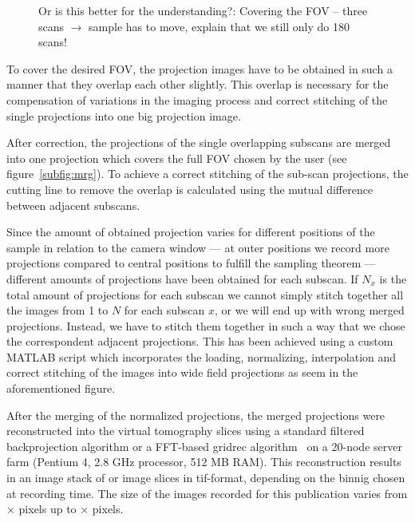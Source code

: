 \begin{figure*}[tb]
	\centering
	
	\caption{Or is this better for the understanding?: Covering the FOV -- three scans $\rightarrow$ sample has to move, explain that we still only do \unit{180}{\degree} scans!}
	\label{fig:covering-three scans b}
\end{figure*}

To cover the desired FOV, the projection images have to be obtained in such a manner that they overlap each other slightly. This overlap is necessary for the compensation of variations in the imaging process and correct stitching of the single projections into one big projection image. 

After correction, the projections of the single overlapping subscans are merged into one projection which covers the full FOV chosen by the user (see figure~\ref{subfig:mrg}). To achieve a correct stitching of the sub-scan projections, the cutting line to remove the overlap is calculated using the mutual difference between adjacent subscans.

Since the amount of obtained projection varies for different positions of the sample in relation to the camera window --- at outer positions we record more projections compared to central positions to fulfill the sampling theorem --- different amounts of projections have been obtained for each subscan. If $N_x$ is the total amount of projections for each subscan we cannot simply stitch together all the images from 1 to $N$ for each subscan $x$, or we will end up with wrong merged projections. Instead, we have to stitch them together in such a way that we chose the correspondent adjacent projections.  This has been achieved using a custom MATLAB\textsuperscript{\textregistered} script which incorporates the loading, normalizing, interpolation and correct stitching of the images into wide field projections as seem in the aforementioned figure.

After the merging of the normalized projections, the merged projections were reconstructed into the virtual tomography slices using a standard filtered backprojection algorithm or a FFT-based gridrec algorithm~\cite{Dowd2003} on a 20-node server farm (Pentium 4, 2.8 GHz processor, 512 MB RAM). This reconstruction results in an image stack of  or  image slices in tif-format, depending on the binnig chosen at recording time. The size of the images recorded for this publication varies from $\times$ pixels up to $\times$ pixels.